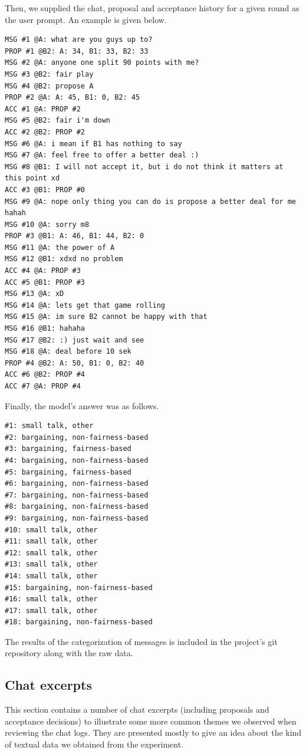 \documentclass[12pt]{article}
\begin{document}
Then, we supplied the chat, proposal and acceptance history for a given round as the user prompt. An example is given below.
\begin{lstlisting}[captionpos=b,caption=User prompt for GPT-4o]
MSG #1 @A: what are you guys up to?
PROP #1 @B2: A: 34, B1: 33, B2: 33
MSG #2 @A: anyone one split 90 points with me?
MSG #3 @B2: fair play
MSG #4 @B2: propose A
PROP #2 @A: A: 45, B1: 0, B2: 45
ACC #1 @A: PROP #2
MSG #5 @B2: fair i'm down
ACC #2 @B2: PROP #2
MSG #6 @A: i mean if B1 has nothing to say
MSG #7 @A: feel free to offer a better deal :)
MSG #8 @B1: I will not accept it, but i do not think it matters at this point xd
ACC #3 @B1: PROP #0
MSG #9 @A: nope only thing you can do is propose a better deal for me hahah
MSG #10 @A: sorry m8
PROP #3 @B1: A: 46, B1: 44, B2: 0
MSG #11 @A: the power of A
MSG #12 @B1: xdxd no problem
ACC #4 @A: PROP #3
ACC #5 @B1: PROP #3
MSG #13 @A: xD
MSG #14 @A: lets get that game rolling
MSG #15 @A: im sure B2 cannot be happy with that
MSG #16 @B1: hahaha
MSG #17 @B2: :) just wait and see
MSG #18 @A: deal before 10 sek
PROP #4 @B2: A: 50, B1: 0, B2: 40
ACC #6 @B2: PROP #4
ACC #7 @A: PROP #4
\end{lstlisting}

Finally, the model's answer was as follows.
\begin{lstlisting}[captionpos=b,caption=Answer from GPT-4o]
#1: small talk, other
#2: bargaining, non-fairness-based
#3: bargaining, fairness-based
#4: bargaining, non-fairness-based
#5: bargaining, fairness-based
#6: bargaining, non-fairness-based
#7: bargaining, non-fairness-based
#8: bargaining, non-fairness-based
#9: bargaining, non-fairness-based
#10: small talk, other
#11: small talk, other
#12: small talk, other
#13: small talk, other
#14: small talk, other
#15: bargaining, non-fairness-based
#16: small talk, other
#17: small talk, other
#18: bargaining, non-fairness-based
\end{lstlisting}

The results of the categorization of messages is included in the project's git repository along with the raw data.

\subsection{Chat excerpts}
\label{sec:chat_excerpts}

This section contains a number of chat excerpts (including proposals and acceptance decisions) to illustrate some more common themes we observed when reviewing the chat logs. They are presented mostly to give an idea about the kind of textual data we obtained from the experiment.
\end{document}
